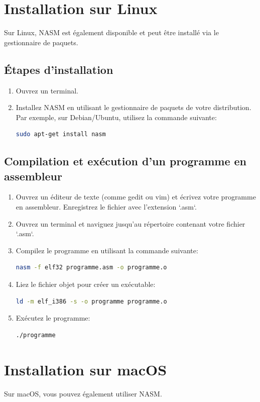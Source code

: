\documentclass[a4paper, 12pt]{report}
\begin{document}
\section{Installation sur Linux}
Sur Linux, NASM est également disponible et peut être installé via le gestionnaire de paquets.

\subsection{Étapes d'installation}
\begin{enumerate}
  \item Ouvrez un terminal.
  \item Installez NASM en utilisant le gestionnaire de paquets de votre distribution. Par exemple, sur Debian/Ubuntu, utilisez la commande suivante:
  \begin{lstlisting}[language=bash]
  sudo apt-get install nasm
  \end{lstlisting}
\end{enumerate}

\subsection{Compilation et exécution d'un programme en assembleur}
\begin{enumerate}
  \item Ouvrez un éditeur de texte (comme gedit ou vim) et écrivez votre programme en assembleur. Enregistrez le fichier avec l'extension `.asm`.
  \item Ouvrez un terminal et naviguez jusqu'au répertoire contenant votre fichier `.asm`.
  \item Compilez le programme en utilisant la commande suivante:
  \begin{lstlisting}[language=bash]
  nasm -f elf32 programme.asm -o programme.o
  \end{lstlisting}
  \item Liez le fichier objet pour créer un exécutable:
  \begin{lstlisting}[language=bash]
  ld -m elf_i386 -s -o programme programme.o
  \end{lstlisting}
  \item Exécutez le programme:
  \begin{lstlisting}[language=bash]
  ./programme
  \end{lstlisting}
\end{enumerate}

\section{Installation sur macOS}
Sur macOS, vous pouvez également utiliser NASM.
\end{document}
